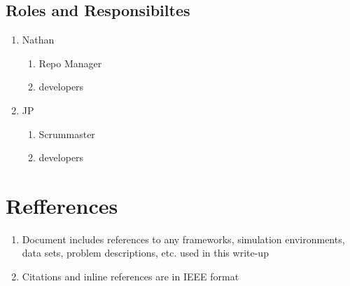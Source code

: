 \documentclass[11pt]{article}
\begin{document}
\subsection{Roles and Responsibiltes}
\begin{enumerate}
\item Nathan
  \begin{enumerate}
  \item Repo Manager
  \item developers
  \end{enumerate}
\item JP
  \begin{enumerate}
    \item Scrummaster
    \item developers
  \end{enumerate}
\end{enumerate}

\section{Refferences}
\begin{enumerate}
\item Document includes references to any frameworks, simulation environments, data sets, problem descriptions,
  etc. used in this write-up
\item Citations and inline references are in IEEE format
\end{enumerate}
\printbibliography
\end{document}
